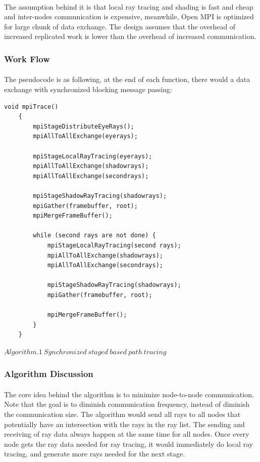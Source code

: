 \documentclass[a4paper, oneside, 10pt]{article}
\begin{document}
\paragraph{}The assumption behind it is that local ray tracing and shading is fast and cheap and inter-nodes communication is expensive, meanwhile, Open MPI is optimized for large chunk of data exchange. The design assumes that the overhead of increased replicated work is lower than the overhead of increased communication.
\subsubsection{Work Flow}
\paragraph{}The pseudocode is as following, at the end of each function, there would a data exchange with synchronized blocking message passing:\\
\lstset{language=c++}
\begin{lstlisting}[frame=single]
    void mpiTrace()
    {
        mpiStageDistributeEyeRays();
        mpiAllToAllExchange(eyerays);
        
        mpiStageLocalRayTracing(eyerays);
        mpiAllToAllExchange(shadowrays);
        mpiAllToAllExchange(secondrays);
        
        mpiStageShadowRayTracing(shadowrays);
        mpiGather(framebuffer, root);
       	mpiMergeFrameBuffer();
        
        while (second rays are not done) {
            mpiStageLocalRayTracing(second rays);
            mpiAllToAllExchange(shadowrays);
            mpiAllToAllExchange(secondrays);
            
            mpiStageShadowRayTracing(shadowrays);
            mpiGather(framebuffer, root);
            
            mpiMergeFrameBuffer();
        }
    }
\end{lstlisting}
$Algorithm. 1\ Synchronized\ staged\ based\ path\ tracing$
\subsubsection{Algorithm Discussion}
\paragraph{} The core idea behind the algorithm is to minimize node-to-node communication. Note that the goal is to diminish communication frequency, instead of diminish the communication size. The algorithm would send all rays to all nodes that potentially have an intersection with the rays in the ray list. The sending and receiving of ray data always happen at the same time for all nodes. Once every node gets the ray data needed for ray tracing, it would immediately do local ray tracing, and generate more rays needed for the next stage. 
\end{document}

